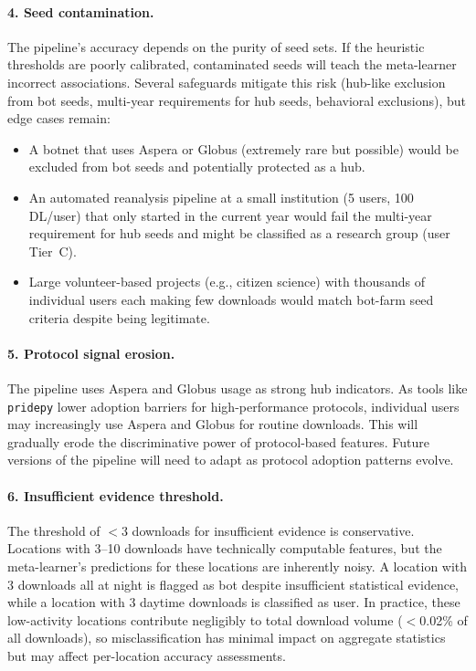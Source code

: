 \documentclass[11pt,a4paper]{article}
\begin{document}
\paragraph{4. Seed contamination.} The pipeline's accuracy depends on the purity of seed sets. If the heuristic thresholds are poorly calibrated, contaminated seeds will teach the meta-learner incorrect associations. Several safeguards mitigate this risk (hub-like exclusion from bot seeds, multi-year requirements for hub seeds, behavioral exclusions), but edge cases remain:
\begin{itemize}
    \item A botnet that uses Aspera or Globus (extremely rare but possible) would be excluded from bot seeds and potentially protected as a hub.
    \item An automated reanalysis pipeline at a small institution (5 users, 100 DL/user) that only started in the current year would fail the multi-year requirement for hub seeds and might be classified as a research group (user Tier~C).
    \item Large volunteer-based projects (e.g., citizen science) with thousands of individual users each making few downloads would match bot-farm seed criteria despite being legitimate.
\end{itemize}

\paragraph{5. Protocol signal erosion.} The pipeline uses Aspera and Globus usage as strong hub indicators. As tools like \texttt{pridepy} lower adoption barriers for high-performance protocols, individual users may increasingly use Aspera and Globus for routine downloads. This will gradually erode the discriminative power of protocol-based features. Future versions of the pipeline will need to adapt as protocol adoption patterns evolve.

\paragraph{6. Insufficient evidence threshold.} The threshold of $<$3 downloads for insufficient evidence is conservative. Locations with 3--10 downloads have technically computable features, but the meta-learner's predictions for these locations are inherently noisy. A location with 3 downloads all at night is flagged as bot despite insufficient statistical evidence, while a location with 3 daytime downloads is classified as user. In practice, these low-activity locations contribute negligibly to total download volume ($<$0.02\% of all downloads), so misclassification has minimal impact on aggregate statistics but may affect per-location accuracy assessments.
\end{document}
